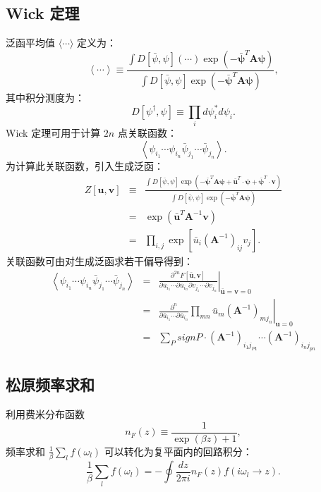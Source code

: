 \documentclass[10pt,UTF8]{ctexart}
\begin{document}
\subsection*{Wick 定理}
\noindent
泛函平均值 $\langle \cdots \rangle$ 定义为：
\begin{equation}
	\left\langle \cdots\right\rangle \equiv\frac{\int D\left[\bar{\psi},\psi\right]\left(\cdots\right)\exp\left(-\bar{\bm{\psi}}^{T}\bm{A}\bm{\psi}\right)}{\int D\left[\bar{\psi},\psi\right]\exp\left(-\bar{\bm{\psi}}^{T}\bm{A}\bm{\psi}\right)},
\end{equation}
其中积分测度为：
\begin{equation}
	D\left[\psi^{\dagger},\psi\right]\equiv\prod_{i}d\psi_{i}^{*}d\psi_{i}.
\end{equation}
Wick 定理可用于计算 $2n$ 点关联函数：
\begin{equation}
	\left\langle \psi_{i_{1}}\cdots\psi_{i_{n}}\bar{\psi}_{j_{1}}\cdots\bar{\psi}_{j_{n}}\right\rangle.
\end{equation}
为计算此关联函数，引入生成泛函：
\begin{eqnarray}
	Z\left[\bm{u},\bm{v}\right] & \equiv & \frac{\int D\left[\bar{\psi},\psi\right]\exp\left(-\bar{\bm{\psi}}^{T}\bm{A}\bm{\psi}+\bar{\bm{u}}^{T}\cdot\bm{\psi}+\bar{\bm{\psi}}^{T}\cdot\bm{v}\right)}{\int D\left[\bar{\psi},\psi\right]\exp\left(-\bar{\bm{\psi}}^{T}\bm{A}\bm{\psi}\right)}\\
 	& = & \exp\left(\bar{\bm{u}}^{T}\bm{A}^{-1}\bm{v}\right)\\
	& = & \prod_{i,j}\exp\left[\bar{u}_{i}\left(\bm{A}^{-1}\right)_{ij}v_{j}\right].
\end{eqnarray}
关联函数可由对生成泛函求若干偏导得到：
\begin{eqnarray}
	\left\langle \psi_{i_{1}}\cdots\psi_{i_{n}}\bar{\psi}_{j_{1}}\cdots\bar{\psi}_{j_{n}}\right\rangle  & = & \left.\frac{\partial^{2n}F\left[\bar{\bm{u}},\bm{v}\right]}{\partial\bar{u}_{i_{1}}\cdots\partial\bar{u}_{i_{n}}\partial v_{j_{1}}\cdots\partial v_{j_{n}}}\right|_{\bar{\bm{u}}=\bm{v}=0}\\
 	& = & \left.\frac{\partial^{n}}{\partial\bar{u}_{i_{1}}\cdots\partial\bar{u}_{i_{n}}}\prod_{mn}\bar{u}_{m}\left(\bm{A}^{-1}\right)_{mj_{n}}\right|_{\bm{u}=0}\\
 	& = & \sum_{P}signP\cdot\left(\bm{A}^{-1}\right)_{i_{1}j_{P1}}\cdots\left(\bm{A}^{-1}\right)_{i_{n}j_{pn}}
\end{eqnarray}



\subsection*{松原频率求和}
\noindent
利用费米分布函数
\begin{equation}
	n_{F}\left(z\right)\equiv\frac{1}{\exp\left(\beta z\right)+1},
\end{equation}
频率求和 $\frac{1}{\beta} \sum_{l}f\left(\omega_{l}\right)$ 可以转化为复平面内的回路积分：
\begin{equation}
	\frac{1}{\beta} \sum_{l}f\left(\omega_{l}\right)=-\oint\frac{dz}{2\pi i}n_{F}\left(z\right)f\left(i\omega_{l}\rightarrow z\right).
\end{equation}
\end{document}
